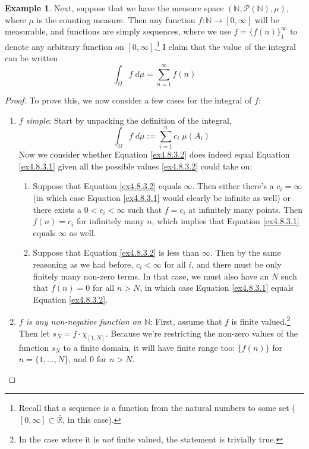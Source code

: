 \documentclass[12pt]{article}
\theoremstyle{plain}
\theoremstyle{definition}
\newtheorem{ex}[thm]{Example}
\theoremstyle{remark}
\begin{document}
\begin{ex}
Next, suppose that we have the measure space
$(\mathbb{N},\mathscr{P}(\mathbb{N}), \mu)$, where $\mu$ is the counting
measure. Then any function $f: \mathbb{N}\rightarrow[0,\infty]$  will be
measurable, and functions are simply sequences, where we use
$f=\{f(n)\}_1^\infty$ to denote any arbitrary function on
$[0,\infty]$.\footnote{Recall that a sequence is a function from the
natural numbers to some set ($[0,\infty]\subset\bar{\mathbb{R}}$, in
this case).} I claim that the value of the integral can be written
\begin{equation}
  \int_\Omega f \; d\mu = \sum^\infty_{n=1}f(n)
  \label{ex4.8.3.1}
\end{equation}
\begin{proof}
To prove this, we now consider a few cases for the integral of $f$:
\begin{enumerate}
  \item {\sl $f$ simple}: Start by unpacking the definition of the
    integral,
    \begin{equation}
      \label{ex4.8.3.2}
      \int_\Omega f \; d\mu := \sum^n_{i=1} c_i \; \mu(A_i)
    \end{equation}
    Now we consider whether Equation \ref{ex4.8.3.2} does indeed equal
    Equation \ref{ex4.8.3.1} given all the possible values
    \ref{ex4.8.3.2} could take on:
    \begin{enumerate}
      \item Suppose that Equation \ref{ex4.8.3.2} equals $\infty$. Then
        either there's a $c_i=\infty$ (in which case Equation
        \ref{ex4.8.3.1} would clearly be infinite as well) or there
        exists a $0< c_i<\infty$ such that $f = c_i$ at infinitely many
        points. Then $f(n)=c_i$ for infinitely many $n$, which implies
        that Equation \ref{ex4.8.3.1} equals $\infty$ as well.

      \item Suppose that Equation \ref{ex4.8.3.2} is less than $\infty$.
        Then by the same reasoning as we had before, $c_i<\infty$ for
        all $i$, and there must be only finitely many non-zero terms. In
        that case, we must also have an $N$ such that $f(n)=0$ for all
        $n>N$, in which case Equation \ref{ex4.8.3.1} equals Equation
        \ref{ex4.8.3.2}.
    \end{enumerate}

  \item {\sl $f$ is any non-negative function on $\mathbb{N}$}: First,
    assume that $f$ is finite valued.\footnote{In the case where it is
      \emph{not} finite valued, the statement is trivially true.}  Then
      let $s_N = f\cdot\chi_{[1,N]}$. Because we're restricting the
      non-zero values of the function $s_N$ to a finite domain, it will
      have finite range too: $\{f(n)\}$ for $n=\{1,\ldots,N\}$, and 0
      for $n>N$.


\end{enumerate}
\end{proof}
\end{ex}
\end{document}
